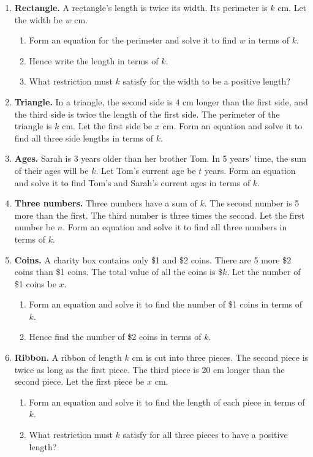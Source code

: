 \documentclass[11pt]{article}
\newcommand{\qspace}{\vspace{1.0cm}}
\begin{document}
\begin{enumerate}
  \item \textbf{Rectangle.} A rectangle's length is twice its width. Its perimeter is $k$ cm. Let the width be $w$ cm.
  \begin{enumerate}
    \item Form an equation for the perimeter and solve it to find $w$ in terms of $k$.
    \item Hence write the length in terms of $k$.
    \item What restriction must $k$ satisfy for the width to be a positive length?
  \end{enumerate}
  \qspace

  \item \textbf{Triangle.} In a triangle, the second side is 4 cm longer than the first side, and the third side is twice the length of the first side. The perimeter of the triangle is $k$ cm. Let the first side be $x$ cm. Form an equation and solve it to find all three side lengths in terms of $k$.
  \qspace

  \item \textbf{Ages.} Sarah is 3 years older than her brother Tom. In 5 years' time, the sum of their ages will be $k$. Let Tom's current age be $t$ years. Form an equation and solve it to find Tom's and Sarah's current ages in terms of $k$.
  \qspace

  \item \textbf{Three numbers.} Three numbers have a sum of $k$. The second number is 5 more than the first. The third number is three times the second. Let the first number be $n$. Form an equation and solve it to find all three numbers in terms of $k$.
  \qspace

  \item \textbf{Coins.} A charity box contains only \$1 and \$2 coins. There are 5 more \$2 coins than \$1 coins. The total value of all the coins is \$$k$. Let the number of \$1 coins be $x$.
  \begin{enumerate}
    \item Form an equation and solve it to find the number of \$1 coins in terms of $k$.
    \item Hence find the number of \$2 coins in terms of $k$.
  \end{enumerate}
  \qspace

  \item \textbf{Ribbon.} A ribbon of length $k$ cm is cut into three pieces. The second piece is twice as long as the first piece. The third piece is 20 cm longer than the second piece. Let the first piece be $x$ cm.
  \begin{enumerate}
    \item Form an equation and solve it to find the length of each piece in terms of $k$.
    \item What restriction must $k$ satisfy for all three pieces to have a positive length?
  \end{enumerate}
  \qspace
\end{enumerate}
\end{document}
